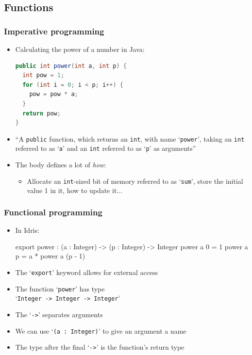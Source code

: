 \documentclass{beamer}
\begin{document}
  \subsection{Functions}
  \begin{frame}[fragile]
    \frametitle{Imperative programming}

    \begin{itemize}
      \item Calculating the power of a number in Java:
            \vspace*{-1mm}
      {\footnotesize
       \begin{lstlisting}[language=java]
public int power(int a, int p) {
  int pow = 1;
  for (int i = 0; i < p; i++) {
    pow = pow * a;
  }
  return pow;
}
      \end{lstlisting}}
      \vspace*{-2mm}
      \item ``A \texttt{public} function, which returns an \texttt{int}, with name
            `\texttt{power}', taking an \texttt{int} referred to as `\texttt{a}'
            and an \texttt{int} referred to as `\texttt{p}' as arguments''
      \item The body defines a lot of \textit{how}:
        \begin{itemize}
          \item Allocate an \texttt{int}-sized bit of memory referred to as
                `\texttt{sum}', store the initial value 1 in it, how to update
                it...
        \end{itemize}
    \end{itemize}

  \end{frame}

  \begin{frame}[fragile]
    \frametitle{Functional programming}

    \begin{itemize}
      \item In Idris:
            \vspace*{-5mm}
      {\footnotesize
        \begin{idrislisting}
export
power : (a : Integer) -> (p : Integer) -> Integer
power a 0 = 1
power a p = a * power a (p - 1)
      \end{idrislisting}}
      \vspace*{-1mm}
      \item The `\texttt{export}' keyword allows for external access
      \item The function `\texttt{power}' has type\\
            `\texttt{Integer -> Integer -> Integer}'
      \item The `\texttt{->}' separates arguments
      \item We can use `\texttt{(a : Integer)}' to give an argument a name
      \item The type after the final `\texttt{->}' is the function's return type
    \end{itemize}

  \end{frame}
\end{document}
